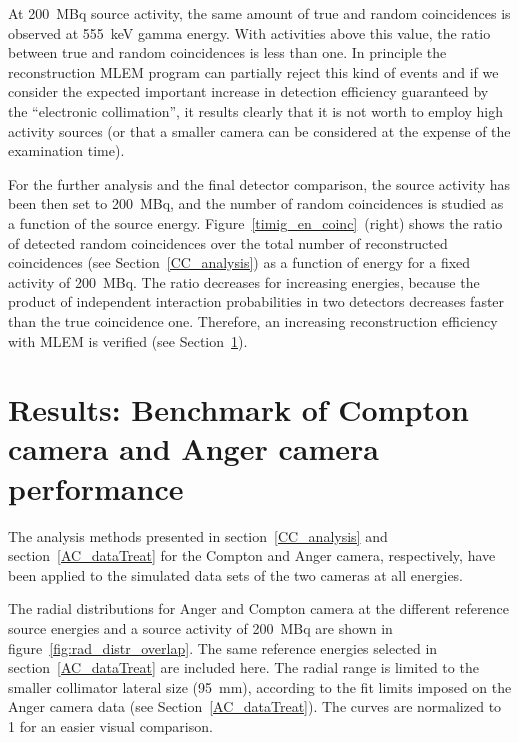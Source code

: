 At 200~MBq source activity, the same amount of true and random coincidences is observed at 555~keV gamma energy. With activities above this value, the ratio between true and random coincidences is less than one. In principle the reconstruction MLEM program can partially reject this kind of events and if we consider the expected important increase in detection efficiency guaranteed by the \enquote{electronic collimation}, it results clearly that it is not worth to employ high activity sources (or that a smaller camera can be considered at the expense of the examination time).

For the further analysis and the final detector comparison, the source activity has been then set to 200~MBq, and the number of random coincidences is studied as a function of the source energy. Figure~\ref{timig_en_coinc}~(right) shows the ratio of detected random coincidences over the total number of reconstructed coincidences (see Section~\ref{CC_analysis}) as a function of energy for a fixed activity of 200~MBq. The ratio decreases for increasing energies, because the product of
independent interaction probabilities in two detectors decreases faster
than the true coincidence one. Therefore, an increasing reconstruction
efficiency with MLEM is verified (see Section~\ref{Results_benchmark}).

\section{Results: Benchmark of Compton camera and Anger camera performance}\label{Results_benchmark}

The analysis methods presented in section~\ref{CC_analysis} and section~\ref{AC_dataTreat} for the Compton and Anger camera, respectively, have been applied to the simulated data sets of the two cameras at all energies.

The radial distributions for Anger and Compton camera at the different reference source energies and a source activity of 200~MBq are shown in figure~\ref{fig:rad_distr_overlap}. The same reference energies selected in section~\ref{AC_dataTreat} are included here. The radial range is limited to the smaller collimator lateral size (95~mm), according to the fit limits imposed on the Anger camera data (see Section~\ref{AC_dataTreat}). The curves are normalized to 1 for an easier visual comparison.

